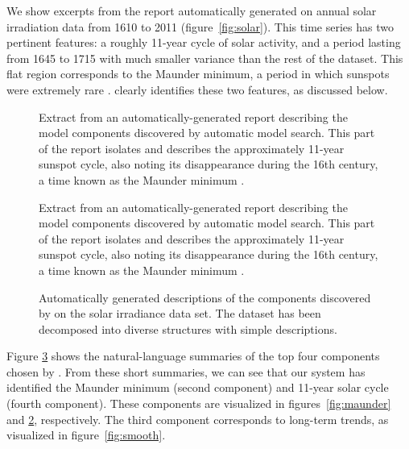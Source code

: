 We show excerpts from the report automatically generated on annual solar irradiation data from 1610 to 2011 (figure~\ref{fig:solar}).
This time series has two pertinent features: a roughly 11-year cycle of solar activity, and a period lasting from 1645 to 1715 with much smaller variance than the rest of the dataset.
This flat region corresponds to the Maunder minimum, a period in which sunspots were extremely rare \citep{lean1995reconstruction}.
\procedurename{} clearly identifies these two features, as discussed below.

\begin{figure}[t]
\centering
{}
\caption[Extract from an automatically-generated report]
{Extract from an automatically-generated report describing the model components discovered by automatic model search.  This part of the report isolates and describes the approximately 11-year sunspot cycle, also noting its disappearance during the 16th century, a time known as the Maunder minimum \citep{lean1995reconstruction}.}
\label{fig:periodic}
\end{figure}

\begin{figure}[ht!]
\centering
{}
\caption[Extract from an automatically-generated report]
{Extract from an automatically-generated report describing the model components discovered by automatic model search.  This part of the report isolates and describes the approximately 11-year sunspot cycle, also noting its disappearance during the 16th century, a time known as the Maunder minimum \citep{lean1995reconstruction}.}
\label{fig:periodic}
\end{figure}

\begin{figure}[ht!]
\centering
{}
\caption[Automatically-generated descriptions of the solar irradiance data set]
{Automatically generated descriptions of the components discovered by \procedurename{} on the solar irradiance data set.
The dataset has been decomposed into diverse structures with simple descriptions.}
\label{fig:exec}
\end{figure}
Figure \ref{fig:exec} shows the natural-language summaries of the top four components chosen by \procedurename{}.
From these short summaries, we can see that our system has identified the Maunder minimum (second component) and 11-year solar cycle (fourth component).
These components are visualized in figures~\ref{fig:maunder} and \ref{fig:periodic}, respectively. 
The third component corresponds to long-term trends, as visualized in figure~\ref{fig:smooth}.

